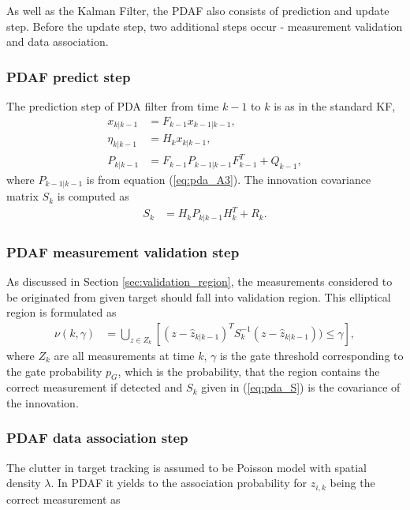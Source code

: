 As well as the Kalman Filter, the PDAF also consists of prediction and update step. Before the update step, two additional steps occur - measurement validation and data association. 
 \subsubsection{PDAF predict step}
The prediction step of PDA filter from time $k-1$ to $k$ is as in the standard KF,
\begin{align}
    x_{k|k-1} &= F_{k-1}x_{k-1|k-1},\\
    \eta_{k|k-1} &= H_k x_{k|k-1},\\
    P_{k|k-1} &= F_{k-1} P_{k-1|k-1} F_{k-1}^T + Q_{k-1},
\end{align}
where $P_{k-1|k-1}$ is from equation (\ref{eq:pda_A3}). The innovation covariance matrix $S_k$ is computed as
\begin{align}
    S_k &= H_{k} P_{k|k-1} H_{k}^T + R_{k}. \label{eq:pda_S}
\end{align}

\subsubsection{PDAF measurement validation step}
As discussed in Section \ref{sec:validation_region}, the measurements considered to be originated from given target should fall into validation region. This elliptical region is formulated as
\begin{align}
    \nu(k,\gamma) &= \bigcup_{z \in Z_k}[(z - \hat{z}_{k|k-1})^T S_k^{-1} (z - \hat{z}_{k|k-1})) \leq \gamma], \label {eq:validation_region}
\end{align}
where $Z_k$ are all measurements at time $k$, $\gamma$ is the gate threshold corresponding to the gate probability $p_G$, which is the probability, that the region contains the correct measurement if detected and $S_k$ given in (\ref{eq:pda_S}) is the covariance of the innovation.

\subsubsection{PDAF data association step}
The clutter in target tracking is assumed to be Poisson model with spatial density $\lambda$. In PDAF it yields to the association probability for $z_{i,k}$ being the correct measurement as

\vspace{-0.5cm}

